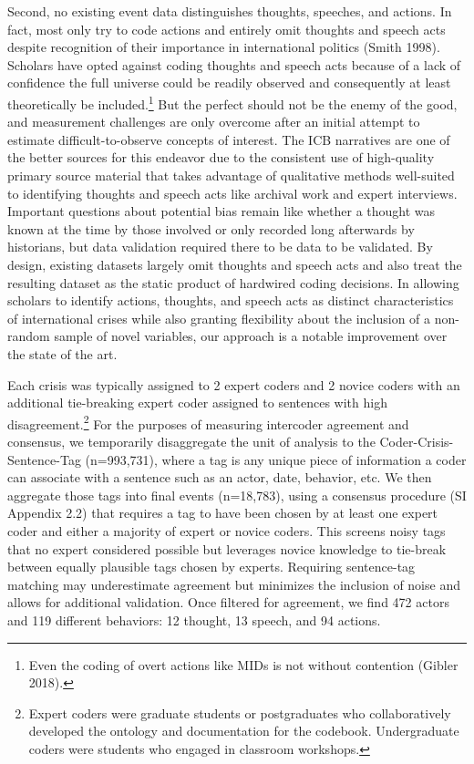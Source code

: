 \documentclass{article}
\begin{document}
Second, no existing event data distinguishes thoughts, speeches, and
actions. In fact, most only try to code actions and entirely omit
thoughts and speech acts despite recognition of their importance in
international politics (Smith 1998). Scholars have opted against coding
thoughts and speech acts because of a lack of confidence the full
universe could be readily observed and consequently at least
theoretically be included.\footnote{Even the coding of overt actions
  like MIDs is not without contention (Gibler 2018).} But the perfect
should not be the enemy of the good, and measurement challenges are only
overcome after an initial attempt to estimate difficult-to-observe
concepts of interest. The ICB narratives are one of the better sources
for this endeavor due to the consistent use of high-quality primary
source material that takes advantage of qualitative methods well-suited
to identifying thoughts and speech acts like archival work and expert
interviews. Important questions about potential bias remain like whether
a thought was known at the time by those involved or only recorded long
afterwards by historians, but data validation required there to be data
to be validated. By design, existing datasets largely omit thoughts and
speech acts and also treat the resulting dataset as the static product
of hardwired coding decisions. In allowing scholars to identify actions,
thoughts, and speech acts as distinct characteristics of international
crises while also granting flexibility about the inclusion of a
non-random sample of novel variables, our approach is a notable
improvement over the state of the art.

Each crisis was typically assigned to 2 expert coders and 2 novice
coders with an additional tie-breaking expert coder assigned to
sentences with high disagreement.\footnote{Expert coders were graduate
  students or postgraduates who collaboratively developed the ontology
  and documentation for the codebook. Undergraduate coders were students
  who engaged in classroom workshops.} For the purposes of measuring
intercoder agreement and consensus, we temporarily disaggregate the unit
of analysis to the Coder-Crisis-Sentence-Tag (n=993,731), where a tag is
any unique piece of information a coder can associate with a sentence
such as an actor, date, behavior, etc. We then aggregate those tags into
final events (n=18,783), using a consensus procedure (SI Appendix 2.2)
that requires a tag to have been chosen by at least one expert coder and
either a majority of expert or novice coders. This screens noisy tags
that no expert considered possible but leverages novice knowledge to
tie-break between equally plausible tags chosen by experts. Requiring
sentence-tag matching may underestimate agreement but minimizes the
inclusion of noise and allows for additional validation. Once filtered
for agreement, we find 472 actors and 119 different behaviors: 12
thought, 13 speech, and 94 actions.
\end{document}
